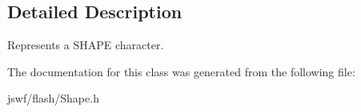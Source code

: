 \subsection{Detailed Description}
Represents a {\ttfamily S\+H\+A\+P\+E} character. 

The documentation for this class was generated from the following file\+:\begin{DoxyCompactItemize}
\item 
jswf/flash/Shape.\+h\end{DoxyCompactItemize}
